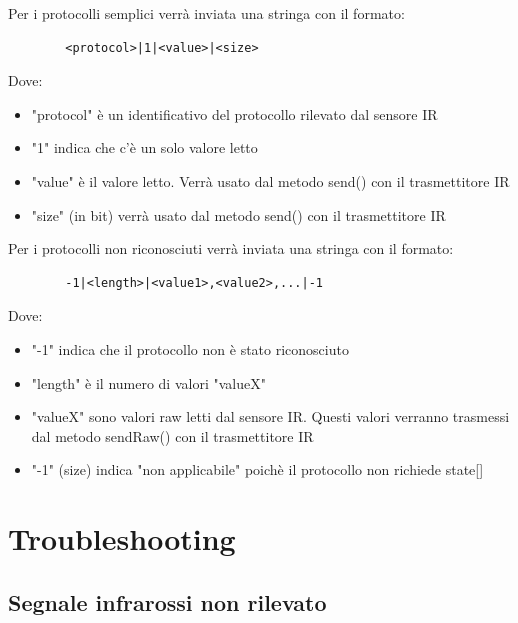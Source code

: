 \documentclass[a4paper,11pt]{article}
\begin{document}
    \begin{samepage}
      Per i protocolli semplici verrà inviata una stringa con il formato:

      \begin{verbatim}
        <protocol>|1|<value>|<size>
      \end{verbatim}

      Dove:
      \begin{itemize}
        \item "protocol" è un identificativo del protocollo rilevato dal sensore IR
        \item "1" indica che c'è un solo valore letto
        \item "value" è il valore letto. Verrà usato dal metodo send() con il trasmettitore IR
        \item "size" (in bit) verrà usato dal metodo send() con il trasmettitore IR
      \end{itemize}
    \end{samepage}

    \bigskip

    \begin{samepage}
      Per i protocolli non riconosciuti verrà inviata una stringa con il formato:

      \begin{verbatim}
        -1|<length>|<value1>,<value2>,...|-1
      \end{verbatim}

      Dove:
      \begin{itemize}
        \item "-1" indica che il protocollo non è stato riconosciuto
        \item "length" è il numero di valori "valueX"
        \item "valueX" sono valori raw letti dal sensore IR. Questi valori verranno trasmessi dal metodo sendRaw() con il trasmettitore IR
        \item "-1" (size) indica "non applicabile" poichè il protocollo non richiede state[]
      \end{itemize}
    \end{samepage}

\section{Troubleshooting}

    \subsection{Segnale infrarossi non rilevato}
\end{document}
